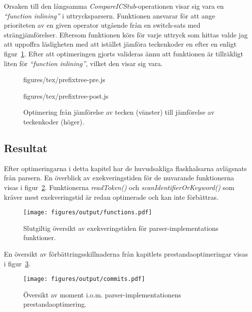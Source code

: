 Orsaken till den långsamma \textit{CompareICStub}-operationen visar sig vara
en \textit{``function inlining''} i uttrycksparsern. Funktionen ansvarar för
att ange prioriteten av en given operator utgående från en switch-sats
med strängjämförelser. Eftersom funktionen körs för varje uttryck som hittas
valde jag att uppoffra läsligheten med att istället jämföra teckenkoder en
efter en enligt figur~\ref{fig:switchtree}. Efter att optimeringen
gjorts valideras ännu att funktionen är tillräkligt liten för
\textit{``function inlining''}, vilket den visar sig vara.

\begin{figure}[ht]
  \begin{minipage}[t]{0.5\textwidth}
      {figures/tex/prefixtree-pre.js}
  \end{minipage}%
  \begin{minipage}[t]{0.5\textwidth}
      {figures/tex/prefixtree-post.js}
  \end{minipage}
  \caption{Optimering från jämförelse av tecken (vänster) till jämförelse av teckenkoder (höger).}
  \label{fig:switchtree}
\end{figure}

\subsection{Resultat}

Efter optimeringarna i detta kapitel har de huvudsakliga flaskhalsarna
avlägsnats från parsern. En överblick av exekveringstiden för de nuvarande
funktionerna visas i figur~\ref{fig:funcdist}. Funktionerna
\textit{readToken()} och \textit{scanIdentifierOrKeyword()} som kräver mest
exekveringstid är redan optimerade och kan inte förbättras.

\begin{figure}[ht]
  \texttt{[image: figures/output/functions.pdf]}
  \caption{Slutgiltig översikt av exekveringstiden för parser-implementations
    funktioner.}
  \label{fig:funcdist}
\end{figure}

En översikt av förbättringsskillnaderna från kapitlets prestandaoptimeringar
visas i figur~\ref{fig:perf-overview}.

\begin{figure}[ht]
  \texttt{[image: figures/output/commits.pdf]}
  \caption{Översikt av moment i.o.m. parser-implementationens
    prestandaoptimering.}
  \label{fig:perf-overview}
\end{figure}

